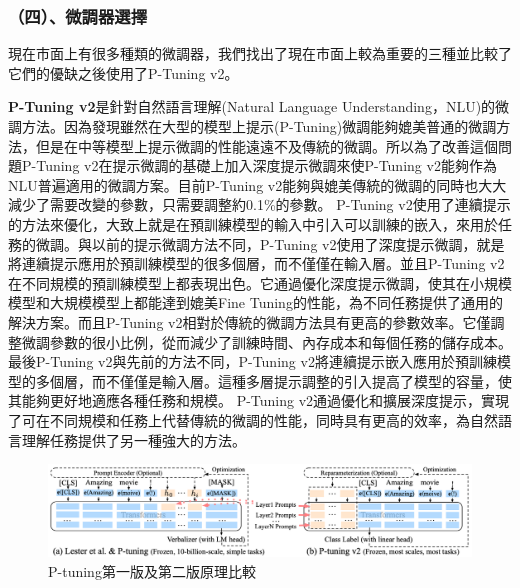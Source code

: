 \documentclass[8pt,a4paper,MingLiU,UTF8]{article}
\begin{document}
	\subsubsection{（四）、微調器選擇}
	現在市面上有很多種類的微調器，我們找出了現在市面上較為重要的三種並比較了它們的優缺之後使用了P-Tuning v2。
	

	\textbf{P-Tuning v2}是針對自然語言理解(Natural Language Understanding，NLU)的微調方法。因為發現雖然在大型的模型上提示(P-Tuning)微調能夠媲美普通的微調方法，但是在中等模型上提示微調的性能遠遠不及傳統的微調。所以為了改善這個問題P-Tuning v2在提示微調的基礎上加入深度提示微調來使P-Tuning v2能夠作為NLU普遍適用的微調方案。目前P-Tuning v2能夠與媲美傳統的微調的同時也大大減少了需要改變的參數，只需要調整約0.1\%的參數。
	P-Tuning v2使用了連續提示的方法來優化，大致上就是在預訓練模型的輸入中引入可以訓練的嵌入，來用於任務的微調。與以前的提示微調方法不同，P-Tuning v2使用了深度提示微調，就是將連續提示應用於預訓練模型的很多個層，而不僅僅在輸入層。並且P-Tuning v2在不同規模的預訓練模型上都表現出色。它通過優化深度提示微調，使其在小規模模型和大規模模型上都能達到媲美Fine Tuning的性能，為不同任務提供了通用的解決方案。而且P-Tuning v2相對於傳統的微調方法具有更高的參數效率。它僅調整微調參數的很小比例，從而減少了訓練時間、內存成本和每個任務的儲存成本。最後P-Tuning v2與先前的方法不同，P-Tuning v2將連續提示嵌入應用於預訓練模型的多個層，而不僅僅是輸入層。這種多層提示調整的引入提高了模型的容量，使其能夠更好地適應各種任務和規模。\cite{houlsby2019parameterefficient}
	P-Tuning v2通過優化和擴展深度提示，實現了可在不同規模和任務上代替傳統的微調的性能，同時具有更高的效率，為自然語言理解任務提供了另一種強大的方法。\cite{liu2022ptuning}
	
	\begin{figure}[H]
		\centering
	\includegraphics[width=\textwidth]{community_8263c05}
		\caption{P-tuning第一版及第二版原理比較\protect\cite{liu2022ptuning}}	
	\end{figure}
\end{document}
